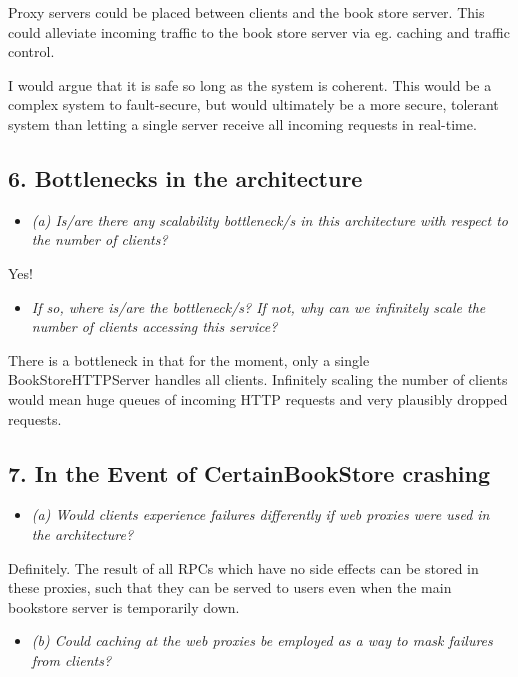 \noindent Proxy servers could be placed between clients and the book store server. This could
alleviate incoming traffic to the book store server via eg. caching and traffic
control. \smallskip

I would argue that it is safe so long as the system is coherent. This would be a
complex system to fault-secure, but would ultimately be a more secure, tolerant
system than letting a single server receive all incoming requests in real-time.

\streg

\subsection{6. Bottlenecks in the architecture}
\begin{itemize}
  \item \textit{(a) Is/are there any scalability bottleneck/s in this architecture
  with respect to the number of clients?}
\end{itemize}

\noindent Yes!

\begin{itemize}
  \item \textit{If so, where is/are the bottleneck/s? If not, why can we infinitely scale the
number of clients accessing this service?}
\end{itemize}

\noindent There is a bottleneck in that for the moment, only a single BookStoreHTTPServer
handles all clients. Infinitely scaling the number of clients would mean huge
queues of incoming HTTP requests and very plausibly dropped requests.

\streg

\subsection{7. In the Event of CertainBookStore crashing}
\begin{itemize}
  \item \textit{(a) Would clients experience failures differently if web proxies were used in the
architecture?}
\end{itemize}

\noindent Definitely. The result of all RPCs which have no side effects can be stored in
these proxies, such that they can be served to users even when the main
bookstore server is temporarily down.

\begin{itemize}
  \item \textit{(b) Could caching at the web proxies be employed as a way to mask failures from
          clients?}
\end{itemize}

